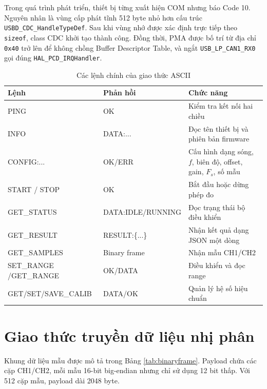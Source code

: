 \documentclass[12pt,a4paper]{report}
\newcommand{\code}[1]{\texttt{#1}}
\newcommand{\tableheadcolor}{\rowcolor{gray!18}}
\begin{document}
Trong quá trình phát triển, thiết bị từng xuất hiện COM nhưng báo Code 10. Nguyên nhân là vùng cấp phát tĩnh 512 byte nhỏ hơn cấu trúc \code{USBD\_CDC\_HandleTypeDef}. Sau khi vùng nhớ được xác định trực tiếp theo \code{sizeof}, class CDC khởi tạo thành công. Đồng thời, PMA được bố trí từ địa chỉ \code{0x40} trở lên để không chồng Buffer Descriptor Table, và ngắt \code{USB\_LP\_CAN1\_RX0} gọi đúng \code{HAL\_PCD\_IRQHandler}.

\begin{table}[H]
\centering
\caption{Các lệnh chính của giao thức ASCII}
\label{tab:commands}
\begin{tabularx}{\textwidth}{|p{3.5cm}|p{3.2cm}|X|}
\hline
\tableheadcolor\textbf{Lệnh} & \textbf{Phản hồi} & \textbf{Chức năng} \\ \hline
PING & OK & Kiểm tra kết nối hai chiều \\ \hline
INFO & DATA:... & Đọc tên thiết bị và phiên bản firmware \\ \hline
CONFIG:... & OK/ERR & Cấu hình dạng sóng, $f$, biên độ, offset, gain, $F_s$, số mẫu \\ \hline
START / STOP & OK & Bắt đầu hoặc dừng phép đo \\ \hline
GET\_STATUS & DATA:IDLE/\newline RUNNING & Đọc trạng thái bộ điều khiển \\ \hline
GET\_RESULT & RESULT:\{...\} & Nhận kết quả dạng JSON một dòng \\ \hline
GET\_SAMPLES & Binary frame & Nhận mẫu CH1/CH2 \\ \hline
SET\_RANGE /\newline GET\_RANGE & OK/DATA & Điều khiển và đọc range \\ \hline
GET/SET/\newline SAVE\_CALIB & DATA/OK & Quản lý hệ số hiệu chuẩn \\ \hline
\end{tabularx}
\end{table}

\section{Giao thức truyền dữ liệu nhị phân}
Khung dữ liệu mẫu được mô tả trong Bảng \ref{tab:binaryframe}. Payload chứa các cặp CH1/CH2, mỗi mẫu 16-bit big-endian nhưng chỉ sử dụng 12 bit thấp. Với 512 cặp mẫu, payload dài 2048 byte.
\end{document}

